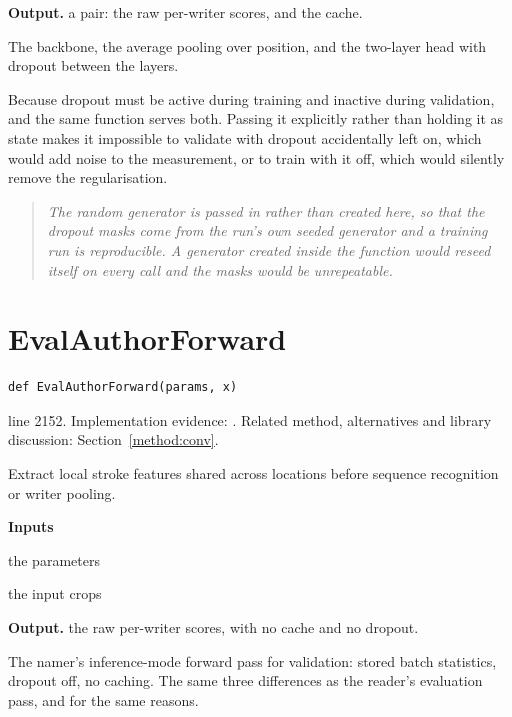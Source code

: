 \noindent\textbf{Output.} a pair: the raw per-writer scores, and the cache.


The backbone, the average pooling over position, and the two-layer head with dropout between the layers.


Because dropout must be active during training and inactive during validation, and the same function serves both. Passing it explicitly rather than holding it as state makes it impossible to validate with dropout accidentally left on, which would add noise to the measurement, or to train with it off, which would silently remove the regularisation.


\begin{quote}\small\itshape The random generator is passed in rather than created here, so that the dropout masks come from the run's own seeded generator and a training run is reproducible. A generator created inside the function would reseed itself on every call and the masks would be unrepeatable.\end{quote}


\section{EvalAuthorForward}\label{fn:train:EvalAuthorForward}
\begin{lstlisting}[style=sig]
def EvalAuthorForward(params, x)
\end{lstlisting}
 line 2152. Implementation evidence: \cite{code2026}. Related method, alternatives and library discussion: Section~\ref{method:conv}.


Extract local stroke features shared across locations before sequence recognition or writer pooling.




\noindent\textbf{Inputs}
\begin{description}[leftmargin=2.2em,style=nextline,font=\normalfont\ttfamily]\setlength\itemsep{1pt}
  \item[{params}] \normalfont the parameters
  \item[{x}] \normalfont the input crops
\end{description}

\noindent\textbf{Output.} the raw per-writer scores, with no cache and no dropout.


The namer's inference-mode forward pass for validation: stored batch statistics, dropout off, no caching. The same three differences as the reader's evaluation pass, and for the same reasons.



